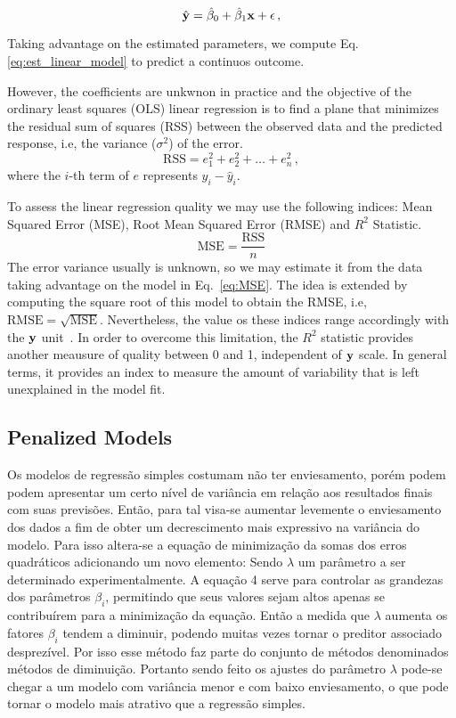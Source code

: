 \begin{equation}
\hat{{\bf y}} = \hat{\beta}_{0} + \hat{\beta}_{1} {\bf x} + {\bf \epsilon} \, ,
\label{eq:est_linear_model}
\end{equation}

Taking advantage on the estimated parameters, we compute Eq. \ref{eq:est_linear_model} to predict a continuos outcome. 

However, the coefficients are unkwnon in practice and the objective of the ordinary least squares (OLS) linear regression is to find a plane that minimizes the residual sum of squares (RSS) between the observed data and the predicted response, i.e, the variance ($\sigma^2$) of the error.     
\begin{equation}
  \text{RSS} = e_1^2 + e_2^2 + \dots + e_n^2 \, , \label{eq:RSS}
\end{equation}
where the $i$-th term of $e$ represents $y_i - \hat{y}_i$.

To assess the linear regression quality we may use the following indices: Mean Squared Error (MSE), Root Mean Squared Error (RMSE) and $R^2$ Statistic.
\begin{equation}
  \text{MSE} = {\frac{\text{RSS}}{n}}
  \label{eq:MSE}
\end{equation}
The error variance usually is unknown, so we may estimate it from the data taking advantage on the model in Eq.~\ref{eq:MSE}. The idea is extended by computing the square root of this model to obtain the RMSE, i.e, $\text{RMSE} = \sqrt{\text{MSE}}$. Nevertheless, the value os these indices range accordingly with the ${\bf y}$ unit~\cite{Kuhn2013}. In order to overcome this limitation, the $R^2$ statistic provides another meausure of quality between 0 and 1, independent of ${\bf y}$ scale. In general terms, it provides an index to measure the amount of variability that is left unexplained in the model fit.

\subsection{Penalized Models}
Os modelos de regressão simples costumam não ter enviesamento, porém podem podem apresentar um certo nível de variância em relação aos resultados finais com suas previsões. Então, para tal visa-se aumentar levemente o enviesamento dos dados a fim de obter um decrescimento mais expressivo na variância do modelo. Para isso altera-se a equação de minimização da somas dos erros quadráticos adicionando um novo elemento: 
Sendo $\lambda$ um parâmetro a ser determinado experimentalmente. A equação 4 serve para controlar as grandezas dos parâmetros  $\beta_i$, permitindo que seus valores sejam altos apenas se contribuírem para a minimização da equação. Então a medida que $\lambda$ aumenta os fatores  $\beta_i$ tendem a diminuir, podendo muitas vezes tornar o preditor associado desprezível. Por isso esse método faz parte do conjunto de métodos denominados métodos de diminuição. Portanto sendo feito os ajustes do parâmetro $\lambda$ pode-se chegar a um modelo com variância menor e com baixo enviesamento, o que pode tornar o modelo mais atrativo que a regressão simples.

